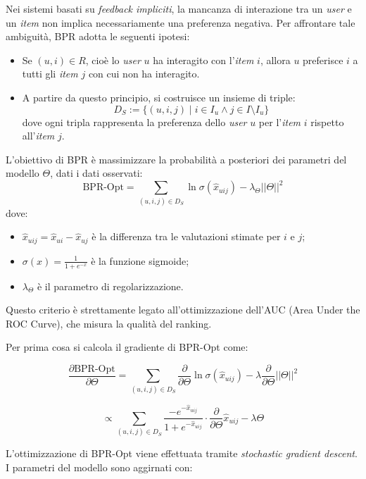 \documentclass{article}
\begin{document}
Nei sistemi basati su \textit{feedback impliciti}, la mancanza di interazione tra un \textit{user} e un \textit{item} non implica necessariamente una preferenza negativa. Per affrontare tale ambiguità, BPR adotta le seguenti ipotesi:

\begin{itemize}
    \item Se $(u, i) \in R$, cioè lo \textit{user} $u$ ha interagito con l'\textit{item} $i$, allora $u$ preferisce $i$ a tutti gli \textit{item} $j$ con cui non ha interagito.
    \item A partire da questo principio, si costruisce un insieme di triple:
    \[
    D_S := \{(u, i, j) \mid i \in I_u \wedge j \in I \setminus I_u\}
    \]
    dove ogni tripla rappresenta la preferenza dello \textit{user} $u$ per l'\textit{item} $i$ rispetto all'\textit{item} $j$.
\end{itemize}

L'obiettivo di BPR è massimizzare la probabilità a posteriori dei parametri del modello $\Theta$, dati i dati osservati:
\[
\text{BPR-Opt} = \sum_{(u, i, j) \in D_S} \ln \sigma(\hat{x}_{uij}) - \lambda_\Theta ||\Theta||^2
\]
dove:
\begin{itemize}
    \item $\hat{x}_{uij} = \hat{x}_{ui} - \hat{x}_{uj}$ è la differenza tra le valutazioni stimate per $i$ e $j$;
    \item $\sigma(x) = \frac{1}{1 + e^{-x}}$ è la funzione sigmoide;
    \item $\lambda_\Theta$ è il parametro di regolarizzazione.
\end{itemize}

Questo criterio è strettamente legato all'ottimizzazione dell'AUC (Area Under the ROC Curve), che misura la qualità del ranking.

Per prima cosa si calcola il gradiente di BPR-Opt come:

\[
\frac{\partial \text{BPR-Opt}}{\partial \Theta} =
\sum_{(u,i,j) \in D_S} 
\frac{\partial}{\partial \Theta} \ln \sigma(\hat{x}_{uij}) - 
\lambda \frac{\partial}{\partial \Theta} ||\Theta||^2
\]

\[
\propto 
\sum_{(u,i,j) \in D_S} 
\frac{-e^{-\hat{x}_{uij}}}{1 + e^{-\hat{x}_{uij}}} 
\cdot \frac{\partial}{\partial \Theta} \hat{x}_{uij} 
- \lambda \Theta
\]

L'ottimizzazione di BPR-Opt viene effettuata tramite \textit{stochastic gradient descent}. I parametri del modello sono aggirnati con:
\end{document}
